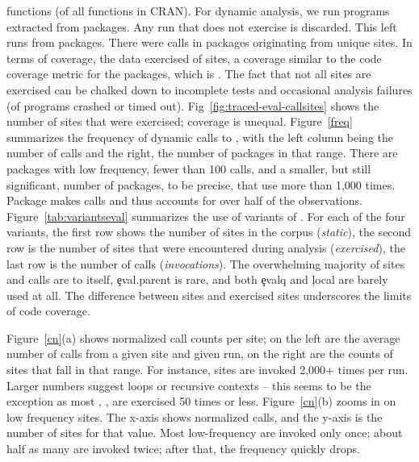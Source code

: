 \documentclass[review,screen,acmsmall]{acmart}
\begin{document}
functions (\CranFunsWithEvalRatio of all functions in CRAN).
For dynamic analysis, we run \CranRunnableScripts programs extracted from
\CranPackages packages. Any run that does not exercise \eval is discarded. This
left \packageNbruns runs from \packageCorpus packages. There were
\packageAllcalls calls in \packageTriggeredpkgs packages originating from
\PkgHitEvalCallSites unique sites. In terms of coverage, the data exercised
\PkgHitEvalCallSitesAvgRatio of sites, a coverage similar to the code coverage
metric for the packages, which is \PkgCodeCoverage. The fact that not all sites
are exercised can be chalked down to incomplete tests and occasional analysis
failures (\PkgFailedProgramsRatio of programs crashed or timed out).
Fig~\ref{fig:traced-eval-callsites} shows the number of sites that were
exercised; coverage is unequal. Figure~\ref{freq} summarizes the frequency of
dynamic calls to \eval, with the left
column being the number of calls and the right, the number of packages in that
range. There are \packageFewcalls packages with low \eval frequency, fewer than
100 calls, and a smaller, but still significant, number of packages,
\packageManycalls to be precise, that use \eval more than 1,000 times. Package
\packageMaxcallspack makes \packageMaxcalls calls and thus accounts for over
half of the observations. Figure~\ref{tab:variantseval} summarizes the use of
variants of \eval. For each of the four variants, the first row shows the number
of sites in the corpus (\emph{static}), the second row is the number of sites
that were encountered during analysis (\emph{exercised}), the last row is the
number of calls (\emph{invocations}). The overwhelming majority of sites and
calls are to \eval itself, \c{eval.parent} is rare, and both \c{evalq} and
\c{local} are barely used at all. The difference between sites and exercised
sites underscores the limits of code coverage.


Figure~\ref{cn}(a) shows normalized call counts per site; on the left are
the average number of calls from a given site and given run, on the right are the counts of sites that fall in that range. For instance, \packageRunbinh sites are
invoked 2,000+ times per run. Larger numbers suggest loops or recursive contexts
-- this seems to be the exception as most \evals, \packageRunbina, are exercised
50 times or less. Figure~\ref{cn}(b) zooms in on low frequency sites. The x-axis
shows normalized calls, and the y-axis is the number of sites for that value. Most
low-frequency \evals are invoked only once; about half as many are invoked
twice; after that, the frequency quickly drops.
\end{document}

